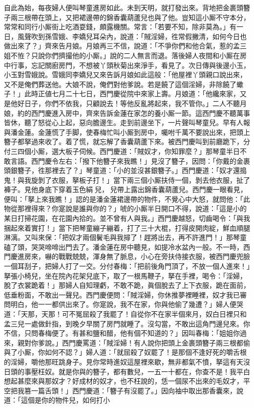 自此為始，每夜婦人便叫琴童進房如此。未到天明，就打發出來。背地把金裹頭簪子兩三根帶在頭上，又把裙邊帶的錦香囊葫蘆兒也與了他。豈知這小厮不守本分，常常和同行小厮街上吃酒耍錢，頗露機關。常言：「若要不知，除非莫為。」有一日，風聲吹到孫雪娥、李嬌兒耳朵內，說道：「賊淫婦，徃常假撇清，如何今日也做出來了？」齊來告月娘。月娘再三不信，{}說道：「不爭你們和他合氣，惹的孟三姐不恠？只說你們擠撮他的小厮。」說的二人無言而退。落後婦人夜間和小厮在房中行事，忘記關廚房門，不想被丫頭秋菊出來淨手，看見了。次日傳與後邊小玉，小玉對雪娥說。雪娥同李嬌兒又來告訴月娘如此這般：「他屋裡丫頭親口說出來，又不是俺們葬送他。大娘不說，俺們對他爹說。若是饒了這個淫婦，非除饒了蠍子！」此時正値七月二十七日，西門慶從院中來家上壽。月娘道：「他纔來家，又是他好日子，你們不依我，只顧說去！等他反亂將起來，我不管你。」二人不聽月娘，約的西門慶進入房中，齊來告訴金蓮在家怎的養小厮一節。這西門慶不聽萬事皆休，聽了怒從心上起，惡向膽邊生。走到前邊坐下，一片聲叫琴童兒。早有人報與潘金蓮。金蓮慌了手脚，使春梅忙叫小厮到房中，囑咐千萬不要說出來，把頭上簪子都拏過來收了。着了慌，就忘解了香囊葫蘆下來。{}被西門慶叫到前廳跪下，分付三四個小厮，選大板子伺候。西門慶道：「賊奴才，你知罪麼？」那琴童半日不敢言語。西門慶令左右：「撥下他簪子來我瞧！」見沒了簪子，因問：「你戴的金裹頭銀簪子，徃那裡去了？」琴童道：「小的並沒甚銀簪子。」西門慶道：「奴才還搗鬼！與我旋剝了衣服，拏板子打！」當下兩三個小厮扶侍一個，剝去他衣服，扯了褲子。見他身底下穿着玉色絹𧜽兒，𧜽兒帶上露出錦香囊葫蘆兒。西門慶一眼看見，便叫：「拏上來我瞧！」認的是潘金蓮裙邊帶的物件，{}不覺心中大怒，就問他：「此物從那裡得來？你寔說是誰與你的？」唬的小厮半日開口不得，說道：「這是小的某日打掃花園，在花園內拾的。並不曾有人與我。」西門慶越怒，切齒喝令：「與我捆起來着實打！」當下把琴童繃子繃着，打了三十大棍，打得皮開肉綻，鮮血順腿淋漓。又叫來保：「把奴才兩個鬢毛與我撏了！趕將出去，再不許進門！」{}那琴童磕了頭，哭哭啼啼出門去了。潘金蓮在房中聽見，如提冷水盆內一般。不一時，西門慶進房來，嚇的戰戰兢兢，渾身無了脈息，小心在旁扶侍接衣服，被西門慶兜臉一個耳刮子，把婦人打了一交。分付春梅：「把前後角門頂了，不放一個人進來！」拏張小椅兒，坐在院內花架兒底下，取了一根馬鞭子，拏在手裡，喝令：「淫婦，脫了衣裳跪着！」那婦人自知理虧，不敢不跪，眞個脫去了上下衣服，跪在面前，低垂粉面，不敢出一聲兒。{}西門慶便問：「賊淫婦，你休推夢裡睡裡，奴才我已審問明白，他一一都供出來了。你寔說，我不在家，你與他偷了幾遭？」婦人便哭道：「天那，天那！可不冤屈殺了我罷了！自從你不在家半個來月，奴白日裡只和孟三兒一處做針指，到晚夕早關了房門就睡了。沒勾當，不敢出這角門邊兒來。你不信，只問春梅便了。{}有甚和鹽和醋，他有個不知道的？」因叫春梅：「姐姐你過來，親對你爹說。」西門慶罵道：「賊淫婦！有人說你把頭上金裹頭簪子兩三根都偷與了小厮，你如何不認？」{}婦人道：「就屈殺了奴罷了！是那個不逢好死的嚼舌根的淫婦，嚼他那旺跳身子。見你常時進奴這屋裡來歇，無非都氣不憤，拏這有天沒日頭的事壓枉奴。就是你與的簪子，都有數兒，一五一十都在，你查不是！我平白想起甚麼來與那奴才？好成材的奴才，也不枉說的，恁一個尿不出來的毛奴才，{}平空把我篡一篇舌頭！」西門慶道：「簪子有沒罷了。」因向袖中取出那香囊來，說道：「這個是你的物件兒，如何打小